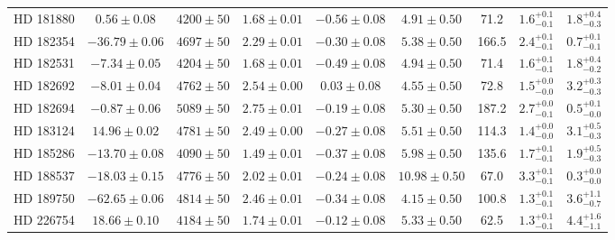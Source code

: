 \begin{table*}
\begin{tabular}{ccccccccc}
HD 181880 & $0.56 \pm 0.08$ & $4200 \pm 50$ & $1.68 \pm 0.01$ & $-0.56 \pm 0.08$ & $4.91 \pm 0.50$ & 71.2 & $1.6^{+0.1}_{-0.1}$ & $1.8^{+0.4}_{-0.3}$ \\
HD 182354 & $-36.79 \pm 0.06$ & $4697 \pm 50$ & $2.29 \pm 0.01$ & $-0.30 \pm 0.08$ & $5.38 \pm 0.50$ & 166.5 & $2.4^{+0.1}_{-0.1}$ & $0.7^{+0.1}_{-0.1}$ \\
HD 182531 & $-7.34 \pm 0.05$ & $4204 \pm 50$ & $1.68 \pm 0.01$ & $-0.49 \pm 0.08$ & $4.94 \pm 0.50$ & 71.4 & $1.6^{+0.1}_{-0.1}$ & $1.8^{+0.4}_{-0.2}$ \\
HD 182692 & $-8.01 \pm 0.04$ & $4762 \pm 50$ & $2.54 \pm 0.00$ & $0.03 \pm 0.08$ & $4.55 \pm 0.50$ & 72.8 & $1.5^{+0.0}_{-0.0}$ & $3.2^{+0.3}_{-0.3}$ \\
HD 182694 & $-0.87 \pm 0.06$ & $5089 \pm 50$ & $2.75 \pm 0.01$ & $-0.19 \pm 0.08$ & $5.30 \pm 0.50$ & 187.2 & $2.7^{+0.0}_{-0.1}$ & $0.5^{+0.1}_{-0.0}$ \\
HD 183124 & $14.96 \pm 0.02$ & $4781 \pm 50$ & $2.49 \pm 0.00$ & $-0.27 \pm 0.08$ & $5.51 \pm 0.50$ & 114.3 & $1.4^{+0.0}_{-0.0}$ & $3.1^{+0.5}_{-0.3}$ \\
HD 185286 & $-13.70 \pm 0.08$ & $4090 \pm 50$ & $1.49 \pm 0.01$ & $-0.37 \pm 0.08$ & $5.98 \pm 0.50$ & 135.6 & $1.7^{+0.1}_{-0.1}$ & $1.9^{+0.5}_{-0.3}$ \\
HD 188537 & $-18.03 \pm 0.15$ & $4776 \pm 50$ & $2.02 \pm 0.01$ & $-0.24 \pm 0.08$ & $10.98 \pm 0.50$ & 67.0 & $3.3^{+0.1}_{-0.1}$ & $0.3^{+0.0}_{-0.0}$ \\
HD 189750 & $-62.65 \pm 0.06$ & $4814 \pm 50$ & $2.46 \pm 0.01$ & $-0.34 \pm 0.08$ & $4.15 \pm 0.50$ & 100.8 & $1.3^{+0.1}_{-0.1}$ & $3.6^{+1.1}_{-0.7}$ \\
HD 226754 & $18.66 \pm 0.10$ & $4184 \pm 50$ & $1.74 \pm 0.01$ & $-0.12 \pm 0.08$ & $5.33 \pm 0.50$ & 62.5 & $1.3^{+0.1}_{-0.1}$ & $4.4^{+1.6}_{-1.1}$ \\
\hline
\end{tabular}
\end{table*}
